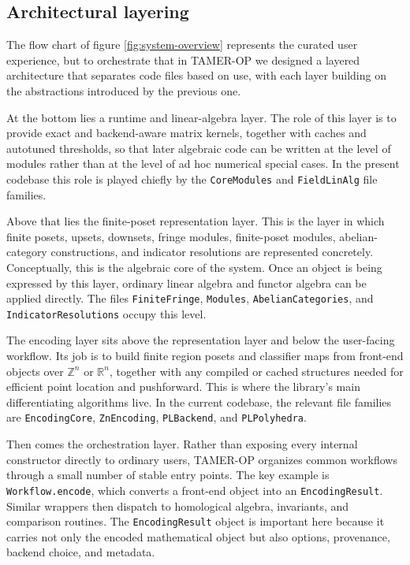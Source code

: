\documentclass[11pt]{article}
\newcommand{\TAMER}{\textsc{TAMER-OP}}
\theoremstyle{definition}
\theoremstyle{remark}
\begin{document}
\subsection{Architectural layering}

The flow chart of figure \ref{fig:system-overview} represents the curated user experience, but to orchestrate that in \TAMER{} we designed a layered architecture that separates code files based on use, with each layer building on the abstractions introduced by the previous one.

At the bottom lies a runtime and linear-algebra layer.  The role of this layer is to provide exact and backend-aware matrix kernels, together with caches and autotuned thresholds, so that later algebraic code can be written at the level of modules rather than at the level of ad hoc numerical special cases.  In the present codebase this role is played chiefly by the \texttt{CoreModules} and \texttt{FieldLinAlg} file families.

Above that lies the finite-poset representation layer.  This is the layer in which finite posets, upsets, downsets, fringe modules, finite-poset modules, abelian-category constructions, and indicator resolutions are represented concretely.  Conceptually, this is the algebraic core of the system.  Once an object is being expressed by this layer, ordinary linear algebra and functor algebra can be applied directly.  The files \texttt{FiniteFringe}, \texttt{Modules}, \texttt{AbelianCategories}, and \texttt{IndicatorResolutions} occupy this level.

The encoding layer sits above the representation layer and below the user-facing workflow.  Its job is to build finite region posets and classifier maps from front-end objects over $\mathbb{Z}^n$ or $\mathbb{R}^n$, together with any compiled or cached structures needed for efficient point location and pushforward.  This is where the library's main differentiating algorithms live.  In the current codebase, the relevant file families are \texttt{EncodingCore}, \texttt{ZnEncoding}, \texttt{PLBackend}, and \texttt{PLPolyhedra}.

Then comes the orchestration layer.  Rather than exposing every internal constructor directly to ordinary users, \TAMER{} organizes common workflows through a small number of stable entry points.  The key example is \texttt{Workflow.encode}, which converts a front-end object into an \texttt{EncodingResult}.  Similar wrappers then dispatch to homological algebra, invariants, and comparison routines.  The \texttt{EncodingResult} object is important here because it carries not only the encoded mathematical object but also options, provenance, backend choice, and metadata.
\end{document}
